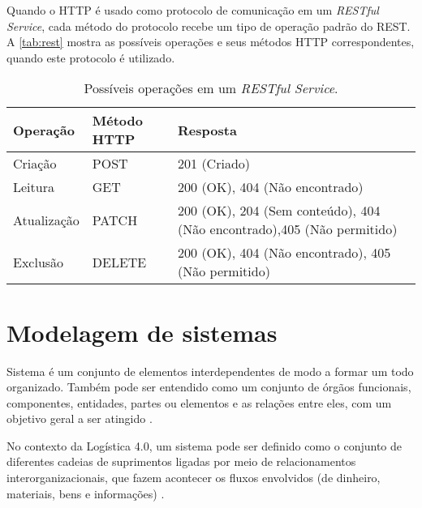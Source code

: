 	Quando o HTTP é usado como protocolo de comunicação em um \textit{RESTful Service}, cada método do protocolo recebe um tipo de operação padrão do REST. A \autoref{tab:rest} mostra as possíveis operações e seus métodos HTTP correspondentes, quando este protocolo é utilizado.
	

	\begin{table}[htb]
		\centering
		\footnotesize
		\label{tab:rest}
		\begin{tabular}{p{2cm}p{2cm}p{8cm}}
			\hline
			\textbf{Operação} &
			\textbf{Método \newline HTTP} &
			\textbf{Resposta} \\[5mm]

			\hline
			Criação &
			POST &
			201 (Criado) \\[5mm]
			
			\hline
			Leitura &
			GET &
			200 (OK), 404 (Não encontrado)  \\[5mm]
			
			\hline
			Atualização &
			PATCH &
			200 (OK), 204 (Sem conteúdo), 404 (Não encontrado),405 (Não permitido) \\[5mm]
			
			
			\hline
			Exclusão &
			DELETE &
			200 (OK), 404 (Não encontrado), 405 (Não permitido) \\[5mm]
			
			\hline
		\end{tabular}
		\caption{Possíveis operações em um \textit{RESTful Service}.}
	\end{table}

\section{Modelagem de sistemas}
\label{sec:modelagem}

	Sistema é um conjunto de elementos interdependentes de modo a formar um todo organizado. Também pode ser entendido como um conjunto de órgãos funcionais, componentes, entidades, partes ou elementos e as relações entre eles, com um objetivo geral a ser atingido \cite{mulbert2005sistemas}.
	
	No contexto da Logística 4.0, um sistema pode ser definido como o conjunto de diferentes cadeias de suprimentos ligadas por meio de relacionamentos interorganizacionais, que fazem acontecer os fluxos envolvidos (de dinheiro, materiais, bens e informações) \cite{oliveira2016supplychain}.
	
